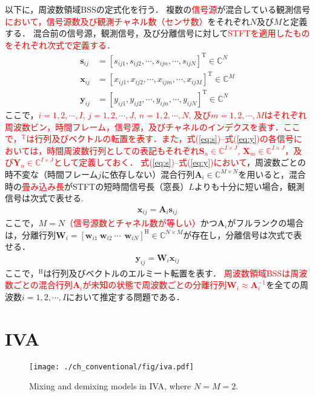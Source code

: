 以下に，周波数領域BSSの定式化を行う．
複数の\textcolor{red}{信号源}が混合している観測信号\textcolor{red}{において，信号源数及び観測チャネル数（センサ数）}をそれぞれ$N$及び$M$と定義する．
混合前の信号源，観測信号，及び分離信号に対して\textcolor{red}{STFTを適用したものをそれぞれ次式で定義する．}
\begin{align}
\bm{s}_{ij} &= [s_{ij1}, s_{ij2}, \cdots, s_{ijn}, \cdots, s_{ijN}]^{\mathrm{T}} \in \mathbb{C}^{N} \label{eq:s} \\
\bm{x}_{ij} &= [x_{ij1}, x_{ij2}, \cdots, x_{ijm}, \cdots, x_{ijM}]^{\mathrm{T}} \in \mathbb{C}^{M} \label{eq:x} \\
\bm{y}_{ij} &= [y_{ij1}, y_{ij2}, \cdots, y_{ijn}, \cdots, y_{ijN}]^{\mathrm{T}} \in \mathbb{C}^{N} \label{eq:y}
\end{align}
ここで，\textcolor{red}{$i=1, 2,  \cdots, I$, $j=1, 2,  \cdots, J$, $n=1, 2,  \cdots, N$, 及び$m=1, 2, \cdots, M$はそれぞれ周波数ビン，時間フレーム，信号源，及びチャネルのインデクスを表す．ここで，$^{\mathrm{T}}$は行列及びベクトルの転置を表す．また，式(\ref{eq:s})--式(\ref{eq:y})の各信号においては，時間周波数行列としての表記もそれぞれ$\bm{S}_n\in\mathbb{C}^{{I\times J}}$, $\bm{X}_m\in\mathbb{C}^{{I\times J}}$，及び$\bm{Y}_n\in\mathbb{C}^{{I\times J}}$として定義しておく．}
\textcolor{red}{式(\ref{eq:s})--式(\ref{eq:y})において}，周波数ごとの時不変な（時間フレーム$j$に依存しない）混合行列$\bm{A}_i \in \mathbb{C}^{M\times N}$を用いると，混合時の\textcolor{red}{畳み込み長}がSTFTの短時間信号長（窓長）$L$よりも十分に短い場合，観測信号は次式で表せる.
\begin{align}
  \bm{x}_{ij} = \bm{A}_i \bm{s}_{ij} \label{eq:xas}
\end{align}
ここで，$M=N$\textcolor{red}{（信号源数とチャネル数が等しい）}かつ$\bm{A}_i$がフルランクの場合は，分離行列$\bm{W}_{i} = [\bm{w}_{i1}~\bm{w}_{i2}~\cdots~ ~\bm{w}_{iN}]^{\mathrm{H}} \in \mathbb{C}^{N \times M} $が存在し，分離信号は次式で表せる．
\begin{align}
  \bm{y}_{ij} = \bm{W}_i \bm{x}_{ij} \label{eq:ywj}
\end{align}
ここで，$^{\mathrm{H}}$は行列及びベクトルのエルミート転置を表す．
\textcolor{red}{周波数領域BSSは周波数ごとの混合行列$\bm{A}_i$が未知の状態で周波数ごとの分離行列$\bm{W}_{i} \approx \bm{A}_i^{-1}$}を全ての周波数$i=1, 2, \cdots, I$において推定する問題である．


\section{IVA}
\label{sec:conv:iva}
\begin{figure}[t]
\centering
\texttt{[image: ./ch\_conventional/fig/iva.pdf]}
\caption{Mixing and demixing models in IVA, where $N=M=2$.}
\label{fig:ivamodel}
\end{figure}

